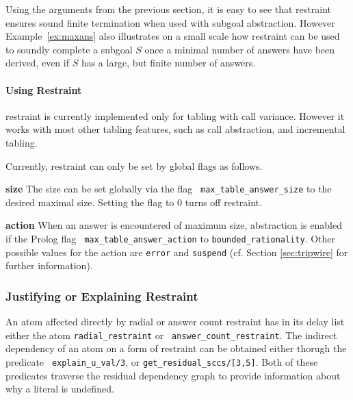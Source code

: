 Using the arguments from the previous section, it is easy to see that
\maxans{} restraint ensures sound finite termination when used with
subgoal abstraction.  However Example~\ref{ex:maxans} also illustrates
on a small scale how \maxans{} restraint can be used to soundly
complete a subgoal $S$ once a minimal number of answers have been
derived, even if $S$ has a large, but finite number of answers.

\paragraph*{Using \MAXANS{} Restraint}
\Maxans{} restraint is currently implemented only for tabling with call
variance.  However it works with most other tabling features, such as
call abstraction, and incremental tabling.

Currently, \maxans{} restraint can only be set by global flags as
follows.
\bi
\item {\bf size} The size can be set globally via the flag {\tt
  max\_table\_answer\_size} to the desired maximal size.  Setting the
  flag to 0 turns off \maxans{} restraint.

\item {\bf action} When an answer is encountered of maximum size,
  abstraction is enabled if the Prolog flag {\tt
    max\_table\_answer\_action} to {\tt bounded\_rationality}.  Other
  possible values for the action are {\tt error} and {\tt suspend}
  (cf. Section \ref{sec:tripwire} for further information).  
\ei

\subsubsection{Justifying or Explaining Restraint}

An atom affected directly by radial or answer count restraint has in
its delay list either the atom {\tt radial\_restraint} or {\tt
  answer\_count\_restraint}.  The indirect dependency of an atom on a
form of restraint can be obtained either thorugh the predicate {\tt
  explain\_u\_val/3}, or {\tt get\_residual\_sccs/[3,5]}.  Both of
these predicates traverse the residual dependency graph to provide
information about why a literal is undefined.




